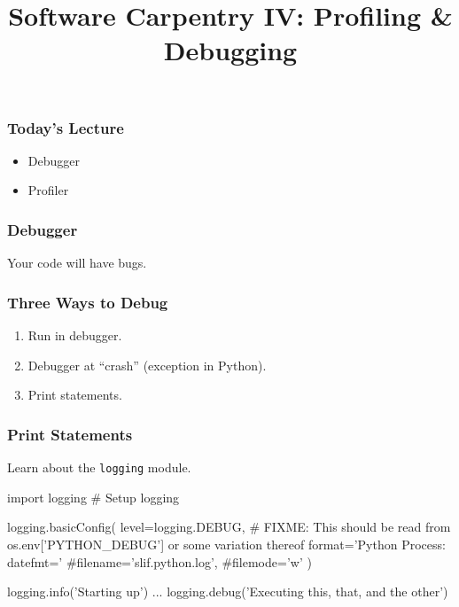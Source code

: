 
\title{Software Carpentry IV: Profiling \& Debugging}

\frame{\maketitle}

\begin{frame}[fragile]
\frametitle{Today's Lecture}

\begin{itemize}
\item Debugger
\item Profiler
\end{itemize}

\end{frame}

\begin{frame}[fragile]
\frametitle{Debugger}

Your code will have bugs.

\end{frame}

\begin{frame}[fragile]
\frametitle{Three Ways to Debug}

\begin{enumerate}
\item Run in debugger.
\item Debugger at ``crash'' (exception in Python).
\item Print statements.
\end{enumerate}

\end{frame}

\begin{frame}[fragile]
\frametitle{Print Statements}

Learn about the \texttt{logging} module.

\begin{python}
import logging
# Setup logging

logging.basicConfig(
            level=logging.DEBUG, # FIXME: This should be read from os.env['PYTHON_DEBUG'] or some variation thereof
            format='Python Process: %
            datefmt='%
            #filename='slif.python.log',
            #filemode='w'
            )

logging.info('Starting up')
...
logging.debug('Executing this, that, and the other')
\end{python}

\end{frame}

